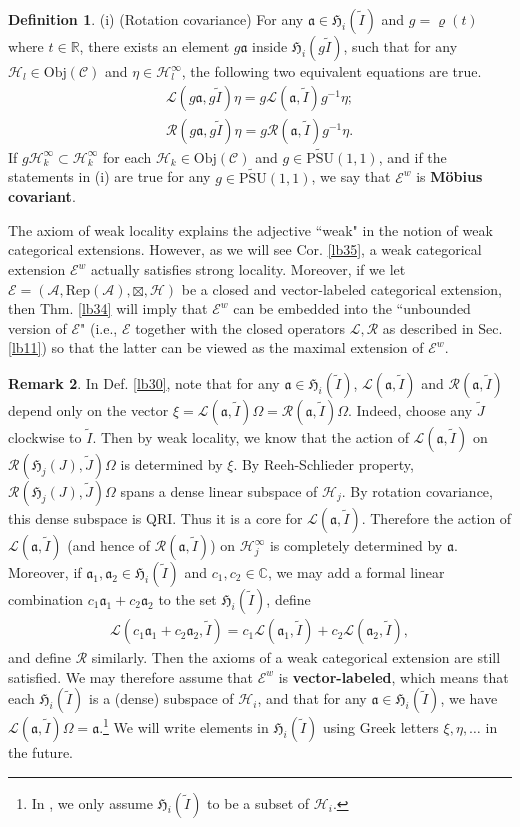 \documentclass[11pt,b5paper,notitlepage]{article}
\theoremstyle{definition}
\newtheorem{df}{Definition}[subsection]
\newtheorem{rem}[df]{Remark}
\theoremstyle{plain}
\newcommand{\fk}{\mathfrak}
\newcommand{\mc}{\mathcal}
\newcommand{\wtd}{\widetilde}
\newcommand{\Rep}{\mathrm{Rep}}
\newcommand{\UPSU}{\widetilde{\mathrm{PSU}}(1,1)}
\newcommand{\scr}{\mathscr}
\newcommand{\mbb}{\mathbb}
\newcommand{\Obj}{\mathrm{Obj}}
\numberwithin{equation}{subsection}
\begin{document}
\begin{df}
	(i) (Rotation covariance) 	For any $\fk a\in\fk H_i(\wtd I)$ and $g=\varrho(t)$ where $t\in\mbb R$, there exists an element $g\fk a$ inside $\fk H_i(g\wtd I)$, such that for any $\mc H_l\in\Obj(\scr C)$ and $\eta\in\mc H_l^\infty$, the following two equivalent equations are true.
	\begin{gather}
	\mc L(g\fk a,g\wtd I)\eta=g\mc L(\fk a,\wtd I)g^{-1}\eta;\label{eq27}\\
	\mc R(g\fk a,g\wtd I)\eta=g\mc R(\fk a,\wtd I)g^{-1}\eta.\label{eq28}
	\end{gather}
If $g\mc H_k^\infty\subset\mc H_k^\infty$ for each $\mc H_k\in\Obj(\scr C)$ and $g\in\UPSU$, and if the statements in (i) are true for any $g\in\UPSU$, we say that $\scr E^w$ is \textbf{M\"obius covariant}.
\end{df}

The axiom of weak locality explains the adjective ``weak" in the notion of weak categorical extensions. However, as we will see Cor. \ref{lb35}, a weak categorical extension $\scr E^w$ actually satisfies strong locality. Moreover, if we let $\scr E=(\mc A,\Rep(\mc A),\boxtimes,\mc H)$ be a closed and vector-labeled categorical extension, then Thm. \ref{lb34} will imply that $\scr E^w$ can be embedded into the ``unbounded version of $\scr E$" (i.e., $\scr E$ together with the closed operators $\scr L,\scr R$ as described in Sec. \ref{lb11}) so that the latter can be viewed as the maximal extension of $\scr E^w$.

\begin{rem}
In Def. \ref{lb30}, note that for any $\fk a\in\fk H_i(\wtd I)$, $\mc L(\fk a,\wtd I)$ and $\mc R(\fk a,\wtd I)$ depend only on the vector $\xi=\mc L(\fk a,\wtd I)\Omega=\mc R(\fk a,\wtd I)\Omega$. Indeed, choose any $\wtd J$ clockwise to $\wtd I$. Then by weak locality, we know that the action of $\mc L(\fk a,\wtd I)$ on $\mc R(\fk H_j(J),\wtd J)\Omega$  is determined by $\xi$. By Reeh-Schlieder property, $\mc R(\fk H_j(J),\wtd J)\Omega$ spans a dense linear subspace of $\mc H_j$. By rotation covariance, this dense subspace is QRI. Thus it is a core for $\mc L(\fk a,\wtd I)$. Therefore the action of $\mc L(\fk a,\wtd I)$ (and hence of $\mc R(\fk a,\wtd I)$) on $\mc H_j^\infty$ is completely determined by $\fk a$. Moreover, if $\fk a_1,\fk a_2\in\fk H_i(\wtd I)$ and $c_1,c_2\in\mbb C$, we may add a formal linear combination $c_1\fk a_1+c_2\fk a_2$ to the set $\fk H_i(\wtd I)$, define
\begin{align*}
\mc L(c_1\fk a_1+c_2\fk a_2,\wtd I)=c_1\mc L(\fk a_1,\wtd I)+c_2\mc L(\fk a_2,\wtd I),
\end{align*}
and define $\mc R$ similarly. Then the axioms of a weak categorical extension are still satisfied. We may therefore assume that $\scr E^w$ is \textbf{vector-labeled}, which means that each $\fk H_i(\wtd I)$ is a (dense) subspace of $\mc H_i$, %
and that for any $\fk a\in\fk H_i(\wtd I)$, we have $\mc L(\fk a,\wtd I)\Omega=\fk a$.\footnote{In \cite{Gui21a}, we only assume $\fk H_i(\wtd I)$ to be a subset of $\mc H_i$.} We will write elements in $\fk H_i(\wtd I)$ using Greek letters $\xi,\eta,\dots$ in the future.
\end{rem}
\end{document}
